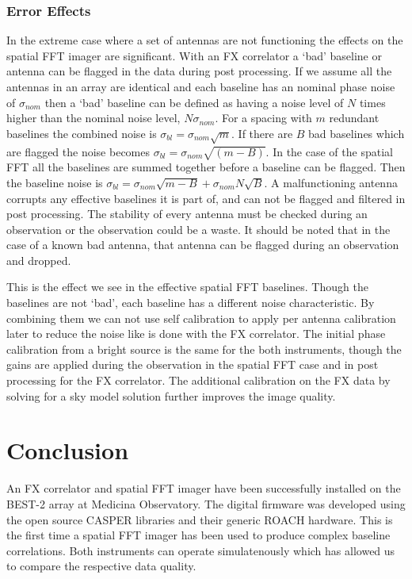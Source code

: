 \documentclass[useAMS,macros,usenatbib]{mn2e}
\begin{document}
\subsubsection{Error Effects}
\label{sfft_error}

In the extreme case where a set of antennas are not functioning the effects on the spatial FFT imager are significant.
With an FX correlator a `bad' baseline or antenna can be flagged in the data during post processing.
If we assume all the antennas in an array are identical and each baseline has an nominal phase noise of $\sigma_{nom}$ then a `bad' baseline can be defined as having a noise level of $N$ times higher than the nominal noise level, $N\sigma_{nom}$.
For a spacing with $m$ redundant baselines the combined noise is $\sigma_{bl}=\sigma_{nom}\sqrt{m}$.
If there are $B$ bad baselines which are flagged the noise becomes $\sigma_{bl}=\sigma_{nom}\sqrt{(m-B)}$.
In the case of the spatial FFT all the baselines are summed together before a baseline can be flagged.
Then the baseline noise is $\sigma_{bl}=\sigma_{nom}\sqrt{m-B}+\sigma_{nom}N\sqrt{B}$.
A malfunctioning antenna corrupts any effective baselines it is part of, and can not be flagged and filtered in post processing.
The stability of every antenna must be checked during an observation or the observation could be a waste.
It should be noted that in the case of a known bad antenna, that antenna can be flagged during an observation and dropped.

This is the effect we see in the effective spatial FFT baselines.
Though the baselines are not `bad', each baseline has a different noise characteristic.
By combining them we can not use self calibration to apply per antenna calibration later to reduce the noise like is done with the FX correlator.
The initial phase calibration from a bright source is the same for the both instruments, though the gains are applied during the observation in the spatial FFT case and in post processing for the FX correlator.
The additional calibration on the FX data by solving for a sky model solution further improves the image quality.

\section{Conclusion}
\label{conclusion}

An FX correlator and spatial FFT imager have been successfully installed on the BEST-2 array at Medicina Observatory.
The digital firmware was developed using the open source CASPER libraries and their generic ROACH hardware.
This is the first time a spatial FFT imager has been used to produce complex baseline correlations.
Both instruments can operate simulatenously which has allowed us to compare the respective data quality.
\end{document}
